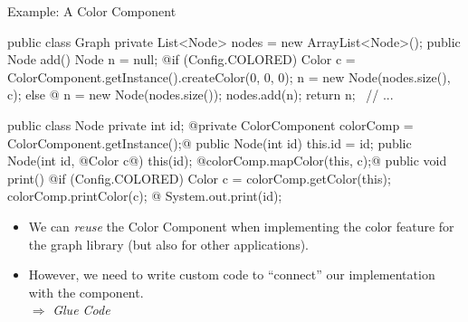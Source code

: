 \begin{frame}[fragile]{Example: A Color Component}
	\begin{mycolumns}[columns=2,widths={60,40},animation=none]
{\small
\begin{codetight}{}
public class Graph {
	private List<Node> nodes = new ArrayList<Node>();
	public Node add() {
		Node n = null;
		@if (Config.COLORED) {
			Color c = ColorComponent.getInstance().createColor(0, 0, 0);
			n = new Node(nodes.size(), c);
		} else @ {
			n = new Node(nodes.size());
		}
		nodes.add(n);
		return n;
	}
	~// ...~
}
\end{codetight}
}
		\mynextcolumn
\vspace{-0.5cm}
{\small
\begin{codetight}{}
public class Node {
	private int id;
	@private ColorComponent colorComp =
		ColorComponent.getInstance();@
	public Node(int id) { this.id = id; }
	public Node(int id, @Color c@) {
		this(id);
		@colorComp.mapColor(this, c);@
	}
	public void print() {
		@if (Config.COLORED) {
			Color c = colorComp.getColor(this);
			colorComp.printColor(c);
		}@
		System.out.print(id);
	}
}
\end{codetight}
}			
	\end{mycolumns}
	\begin{note}{}
		\begin{itemize}
			\item We can \emph{reuse} the Color Component when implementing the color feature for the graph library (but also for other applications). 
			\item However, we need to write custom code to ``connect'' our implementation with the component.\\
				$\Rightarrow$ \emph{Glue Code}
		\end{itemize}
	\end{note}
\end{frame}

